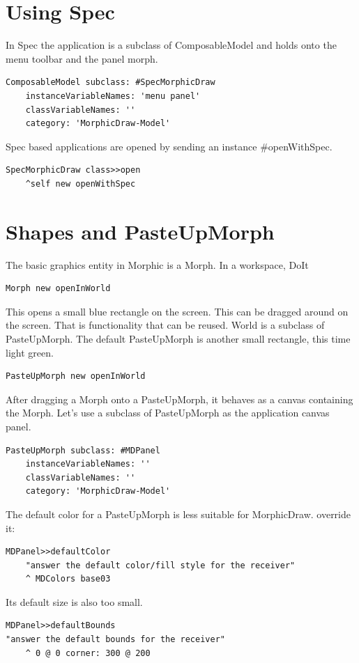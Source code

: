 \documentclass[10pt]{article}   	%
\begin{document}
\section{Using Spec}
In Spec the application is a subclass of ComposableModel and holds onto the menu toolbar
and the panel morph.
\begin{verbatim}
ComposableModel subclass: #SpecMorphicDraw
    instanceVariableNames: 'menu panel'
    classVariableNames: ''
    category: 'MorphicDraw-Model'
\end{verbatim}
Spec based applications are opened by sending an instance \#openWithSpec.
\begin{verbatim}
SpecMorphicDraw class>>open
	^self new openWithSpec
\end{verbatim}

\section{Shapes and PasteUpMorph}
The basic graphics entity in Morphic is a Morph. In a workspace, DoIt
\begin{verbatim}
Morph new openInWorld
\end{verbatim}
This opens a small blue rectangle on the screen. This can be dragged around on 
the screen. That is functionality that can be reused. World is a subclass of 
PasteUpMorph. The default PasteUpMorph is another small rectangle, this
time light green. 
\begin{verbatim}
PasteUpMorph new openInWorld
\end{verbatim}
After dragging a Morph onto a PasteUpMorph, it behaves as
a canvas containing the Morph. Let's use a subclass of PasteUpMorph
as the application canvas panel. 
\begin{verbatim}
PasteUpMorph subclass: #MDPanel
    instanceVariableNames: ''
    classVariableNames: ''
    category: 'MorphicDraw-Model'
\end{verbatim}
The default color for a PasteUpMorph is less suitable for MorphicDraw.
override it:
\begin{verbatim}
MDPanel>>defaultColor
    "answer the default color/fill style for the receiver"
    ^ MDColors base03
\end{verbatim}
Its default size is also too small.
\begin{verbatim}
MDPanel>>defaultBounds
"answer the default bounds for the receiver"
    ^ 0 @ 0 corner: 300 @ 200
\end{verbatim}
\end{document}
